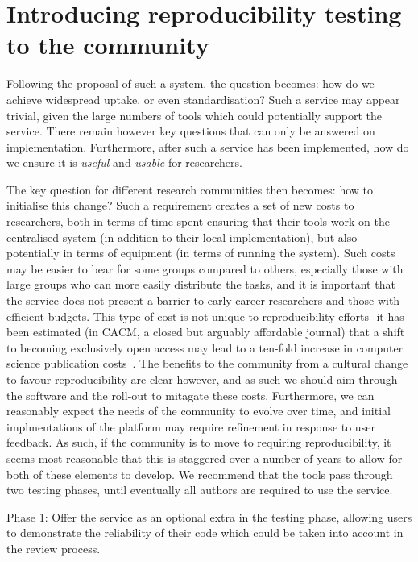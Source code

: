 \documentclass{llncs}
\begin{document}
\section{Introducing reproducibility testing to the community}\label{rollout}

Following the proposal of such a system, the question becomes: how do we achieve 
widespread uptake, or even standardisation? Such a service may appear trivial, given the large numbers of tools which
could potentially support the service. There remain however key questions that
can only be answered on implementation. Furthermore, after such a service has been
implemented, how do we ensure it is \emph{useful} and \emph{usable} for researchers.

The key question for different research communities then becomes: how to initialise 
this change? Such a requirement creates a set of new costs to researchers, both in 
terms of time spent ensuring that their tools work on the centralised system (in 
addition to their local implementation), but also potentially in terms of equipment
(in terms of running the system). Such costs may be easier to bear for some groups 
compared to others, especially those with large groups who can more easily distribute 
the tasks, and it is important that the service does not present a barrier to early 
career researchers and those with efficient budgets. This type of cost is not unique 
to reproducibility efforts- it has been estimated (in CACM, a closed but arguably 
affordable journal) that a shift to becoming exclusively open access may lead to a 
ten-fold increase in computer science publication costs~\cite{vardi-cacm-2014}. The
benefits to the community from a cultural change to favour reproducibility are clear
however, and as such we should aim through the software and the roll-out to mitagate 
these costs. Furthermore,
we can reasonably expect the needs of the community to evolve over time, and initial 
implmentations of the platform may require refinement in response to user feedback. As
such, if the community is to move to requiring reproducibility, it seems most reasonable
that this is staggered over a number of years to allow for both of these elements to
develop. We recommend that the tools pass through two testing phases, until eventually
all authors are required to use the service.

Phase 1: Offer the service as an optional extra in the testing phase, allowing users to demonstrate 
the reliability of their code which could be taken into account in the review process.
\end{document}
